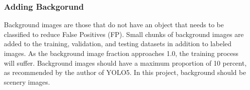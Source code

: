 \subsubsection{Adding Backgorund}
    Background images are those that do not have an object that needs to be classified to reduce False Positives (FP).
    Small chunks of background images are added to the training, validation, and testing datasets in addition to labeled images.
    As the background image fraction approaches 1.0, the training process will suffer.
    Background images should have a maximum proportion of 10 percent, as recommended by the author of YOLO5.
    In this project, background should be scenery images\cite{addingbackgroundimages}. 
    